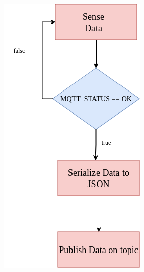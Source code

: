 \documentclass[a4paper,12pt]{article}
\begin{document}
\vspace{10mm}

\begin{center}
\includegraphics[scale=0.5]{flowchart.png}
\end{center}
\end{document}
